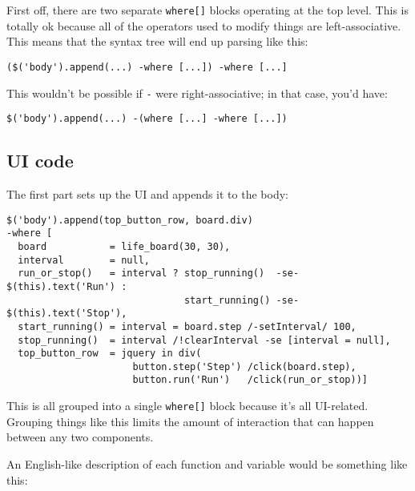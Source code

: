 \documentclass{report}
\begin{document}
    First off, there are two separate {\tt where[]} blocks operating at the top level. This is totally ok because all of the operators used to modify things are left-associative. This means
    that the syntax tree will end up parsing like this:

\begin{verbatim}
($('body').append(...) -where [...]) -where [...]
\end{verbatim}

    This wouldn't be possible if {\tt -} were right-associative; in that case, you'd have:

\begin{verbatim}
$('body').append(...) -(where [...] -where [...])
\end{verbatim}

\subsection{UI code}
      The first part sets up the UI and appends it to the body:

\begin{verbatim}
$('body').append(top_button_row, board.div)
-where [
  board           = life_board(30, 30),
  interval        = null,
  run_or_stop()   = interval ? stop_running()  -se- $(this).text('Run') :
                               start_running() -se- $(this).text('Stop'),
  start_running() = interval = board.step /-setInterval/ 100,
  stop_running()  = interval /!clearInterval -se [interval = null],
  top_button_row  = jquery in div(
                      button.step('Step') /click(board.step),
                      button.run('Run')   /click(run_or_stop))]
\end{verbatim}

      This is all grouped into a single {\tt where[]} block because it's all UI-related. Grouping things like this limits the amount of interaction that can happen between any two components.

      An English-like description of each function and variable would be something like this:
\end{document}
